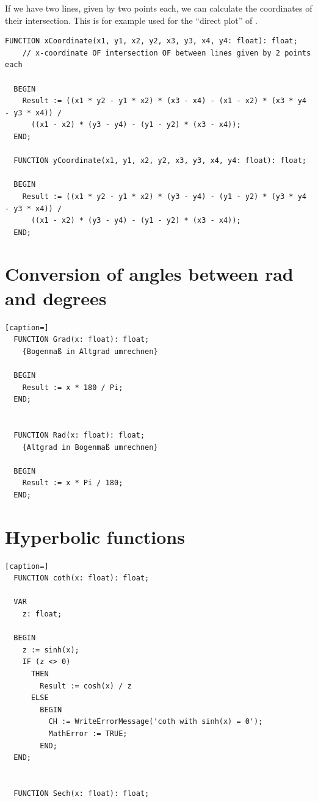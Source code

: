 \begin{refsection}
If we have two lines, given by two points each, we can calculate the coordinates of their intersection. This is for example used for the ``direct plot'' of  \parencite{Cor-74,Eis-74}.

\begin{lstlisting}[caption=Intersection of lines]
  FUNCTION xCoordinate(x1, y1, x2, y2, x3, y3, x4, y4: float): float;
    // x-coordinate OF intersection OF between lines given by 2 points each

  BEGIN
    Result := ((x1 * y2 - y1 * x2) * (x3 - x4) - (x1 - x2) * (x3 * y4 - y3 * x4)) /
      ((x1 - x2) * (y3 - y4) - (y1 - y2) * (x3 - x4));
  END;

  FUNCTION yCoordinate(x1, y1, x2, y2, x3, y3, x4, y4: float): float;

  BEGIN
    Result := ((x1 * y2 - y1 * x2) * (y3 - y4) - (y1 - y2) * (y3 * y4 - y3 * x4)) /
      ((x1 - x2) * (y3 - y4) - (y1 - y2) * (x3 - x4));
  END;
\end{lstlisting}


\section{Conversion of angles between rad and degrees}

\begin{lstlisting}[caption=]
  FUNCTION Grad(x: float): float;
    {Bogenmaß in Altgrad umrechnen}

  BEGIN
    Result := x * 180 / Pi;
  END;


  FUNCTION Rad(x: float): float;
    {Altgrad in Bogenmaß umrechnen}

  BEGIN
    Result := x * Pi / 180;
  END;
\end{lstlisting}

\section{Hyperbolic functions}


\begin{lstlisting}[caption=]
  FUNCTION coth(x: float): float;

  VAR
    z: float;

  BEGIN
    z := sinh(x);
    IF (z <> 0)
      THEN
        Result := cosh(x) / z
      ELSE
        BEGIN
          CH := WriteErrorMessage('coth with sinh(x) = 0');
          MathError := TRUE;
        END;
  END;


  FUNCTION Sech(x: float): float;


\end{lstlisting}
\end{refsection}
